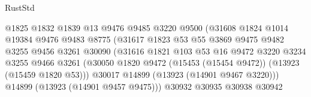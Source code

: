 \begin{lexlean}{RustStd}
\begin{coremodule}
                                        @1825
                                        @1832
                                        @1839
                                        @13
                                        @9476
                                        @9485
                                        @3220
                                        @9500
                                        (@31608
                                          @1824
                                          @1014
                                          @19384
                                          @9476
                                          @9483
                                          @8775
                                          (@31617
                                            @1823
                                            @53
                                            @55
                                            @3869
                                            @9475
                                            @9482
                                            @3255
                                            @9456
                                            @3261
                                            @30090
                                            (@31616
                                              @1821
                                              @103
                                              @53
                                              @16
                                              @9472
                                              @3220
                                              @3234
                                              @3255
                                              @9466
                                              @3261
                                              (@30050
                                                @1820
                                                @9472
                                                (@15453 (@15454 @9472))
                                                (@13923 (@15459 @1820 @53)))
                                              @30017
                                              @14899
                                              (@13923 (@14901 @9467 @3220)))
                                            @14899
                                            (@13923 (@14901 @9457 @9475)))
                                          @30932
                                          @30935
                                          @30938
                                          @30942

\end{coremodule}
\end{lexlean}
